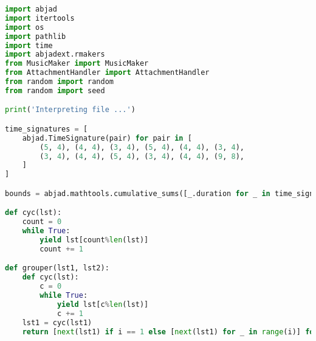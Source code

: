 \begin{lstlisting}[language=Python, caption=Invocation Source Code]
import abjad
import itertools
import os
import pathlib
import time
import abjadext.rmakers
from MusicMaker import MusicMaker
from AttachmentHandler import AttachmentHandler
from random import random
from random import seed

print('Interpreting file ...')

time_signatures = [
    abjad.TimeSignature(pair) for pair in [
        (5, 4), (4, 4), (3, 4), (5, 4), (4, 4), (3, 4),
        (3, 4), (4, 4), (5, 4), (3, 4), (4, 4), (9, 8),
    ]
]

bounds = abjad.mathtools.cumulative_sums([_.duration for _ in time_signatures])

def cyc(lst):
    count = 0
    while True:
        yield lst[count%len(lst)]
        count += 1

def grouper(lst1, lst2):
    def cyc(lst):
        c = 0
        while True:
            yield lst[c%len(lst)]
            c += 1
    lst1 = cyc(lst1)
    return [next(lst1) if i == 1 else [next(lst1) for _ in range(i)] for i in lst2]


\end{lstlisting}
